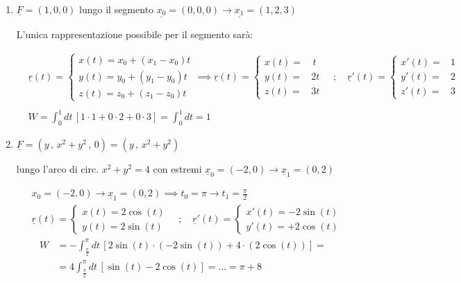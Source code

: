 \begin{enumerate}
	\item $\underline{F}=(1,0,0)$ lungo il segmento $\underline{x_0}=(0,0,0)\longrightarrow \underline{x_1}=(1,2,3)$
	
	L'unica rappresentazione possibile per il segmento sarà:
	
	\begin{align}
		{}&\underline{r}(t)=\left\{
		\begin{array}{ccc}
			x(t) = x_0 + (x_1 - x_0)t\\
			y(t) = y_0 + (y_1 - y_0)t\\
			z(t) = z_0 + (z_1 - z_0)t 
		\end{array}
		\right. \implies
		\underline{r}(t)=\left\{
		\begin{array}{ccc}
			x(t) ={}& \, t\\
			y(t) =& 2t\\
			z(t) =& 3t 
		\end{array}
		\right. \quad ; \quad
		\underline{r}'(t)=\left\{
		\begin{array}{ccc}
			x'(t) ={}& 1\\
			y'(t) =& 2\\
			z'(t) =& 3 
		\end{array}
		\right. \nonumber \\
		\nonumber\\
		&W=\int_{0}^{1} dt \, [1\cdot 1 + 0 \cdot 2 + 0 \cdot 3]= \int_{0}^{1}dt = 1
	\end{align}
	
	\item $\underline{F}=(y \, , \, x^2 + y^2\, , \, 0)=(y\, , \, x^2 + y^2)$ 
	
	lungo l'arco di circ. $x^2 + y^2=4$ con estremi   $\underline{x}_0=(-2,0) \longrightarrow \underline{x}_1=(0,2)$
	
	\begin{align}
		{}& {x}_0=(-2,0) \longrightarrow \underline{x}_1=(0,2) \implies t_0=\pi \longrightarrow t_1=\frac{\pi}{2}\\
		&\underline{r}(t)=\left\{
		\begin{array}{cc}
			x(t)=2\cos(t) \\
			y(t)=2\sin(t)
		\end{array}
		\right. \quad ; \quad
		\underline{r}'(t)=\left\{
		\begin{array}{cc}
			x'(t)=-2\sin(t) \\
			y'(t)=+2\cos(t)
		\end{array}
		\right.
	\end{align}
	\begin{align}
		W {}&= - \int_{\frac{\pi}{2}}^{\pi} dt \, [2\sin(t)\cdot (-2\sin(t)) + 4 \cdot (2\cos(t))] = \nonumber \\
		&=4 \int_{\frac{\pi}{2}}^{\pi} dt \, [\sin(t) -2\cos(t)]= \dots = \pi + 8
	\end{align}
	

\end{enumerate}
